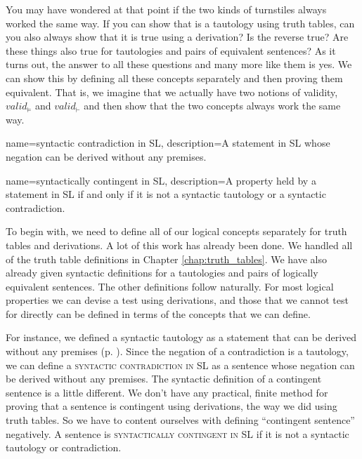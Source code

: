 {You may have wondered at that point if the two kinds of turnstiles always worked the same way. If you can show that  is a tautology using truth tables, can you also always show 
that it is true using a derivation? Is the reverse true? Are these things also true for tautologies and pairs of equivalent sentences? As it turns out, the answer to all these questions 
and many more like them is yes. We can show this by defining all these concepts separately and then proving them equivalent. That is, we imagine that we actually have two notions of 
validity, $valid_{\models}$ and $valid_{\vdash}$ and then show that the two concepts always work the same way.

{
name=syntactic contradiction in SL,
description={A statement in SL whose negation can be derived without any premises.}
}


   
{
name=syntactically contingent in SL,
description={A property held by a statement in SL if and only if it is not a syntactic tautology or a syntactic contradiction.}
}




To begin with, we need to define all of our logical concepts separately for truth tables and derivations. A lot of this work has already been done. We handled all of the truth table definitions in Chapter \ref{chap:truth_tables}. We have also already given syntactic definitions for a tautologies and pairs of logically equivalent sentences. The other definitions follow naturally. For most logical properties we can devise a test using derivations, and those that we cannot test for directly can be defined in terms of the concepts that we can define.

For instance, we defined a syntactic tautology as a statement that can be derived without any premises (p. \pageref{def:syntactic_tautology_in_sl}). Since the negation of a contradiction is a tautology, we can define a \textsc{\gls{syntactic contradiction in SL}} \label{def:syntactic_contradiction_in_sl} as a sentence whose negation can be derived without any premises. The syntactic definition of a contingent sentence is a little different. We don't have any practical, finite method for proving that a sentence is contingent using derivations, the way we did using truth tables. So we have to content ourselves with defining ``contingent sentence'' negatively. A sentence is \textsc{\gls{syntactically contingent in SL}} \label{def:syntactically_contingent_in_sl} if it is not a syntactic tautology or contradiction. 
 
}
